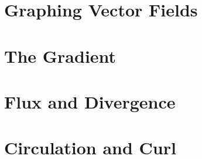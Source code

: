 \section{Graphing Vector Fields}

\section{The Gradient}

\section{Flux and Divergence}

\section{Circulation and Curl}
